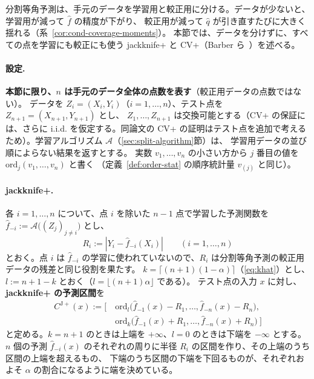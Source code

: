 \documentclass[a4paper,11pt]{jsarticle}
\theoremstyle{definition}
\theoremstyle{plain}
\theoremstyle{remark}
\newcommand{\qhat}{\hat{q}}
\newcommand{\fhat}{\hat{f}}
\begin{document}
分割等角予測は、手元のデータを学習用と較正用に分ける。データが少ないと、学習用が減って $\fhat$ の精度が下がり、
較正用が減って $\qhat$ が引き直すたびに大きく揺れる（系~\ref{cor:cond-coverage-moments}）。
本節では、データを分けずに、すべての点を学習にも較正にも使う jackknife+ と CV+（Barber ら~\cite{barber2021jackknife}）を述べる。

\paragraph{設定.}
\textbf{本節に限り、$n$ は手元のデータ全体の点数を表す}（較正用データの点数ではない）。
データを $Z_i=(X_i,Y_i)$（$i=1,\dots,n$）、テスト点を $Z_{n+1}=(X_{n+1},Y_{n+1})$ とし、
$Z_1,\dots,Z_{n+1}$ は交換可能とする（CV+ の保証には、さらに i.i.d. を仮定する。同論文の CV+ の証明はテスト点を追加で考えるため）。学習アルゴリズム $\mathcal{A}$（\ref{sec:split-algorithm}節）は、
学習用データの並び順によらない結果を返すとする。
実数 $v_1,\dots,v_n$ の小さい方から $j$ 番目の値を $\mathrm{ord}_j(v_1,\dots,v_n)$ と書く
（定義~\ref{def:order-stat} の順序統計量 $v_{(j)}$ と同じ）。

\paragraph{jackknife+.}
各 $i=1,\dots,n$ について、点 $i$ を除いた $n-1$ 点で学習した予測関数を
$\fhat_{-i}:=\mathcal{A}\bigl((Z_j)_{j\ne i}\bigr)$ とし、
\begin{equation}
  \label{eq:loo-residual}
  R_i := |Y_i-\fhat_{-i}(X_i)| \qquad (i=1,\dots,n)
\end{equation}
とおく。点 $i$ は $\fhat_{-i}$ の学習に使われていないので、$R_i$ は分割等角予測の較正用データの残差と同じ役割を果たす。
$k=\lceil(n+1)(1-\alpha)\rceil$（\eqref{eq:khat}）とし、$l:=n+1-k$ とおく（$l=\lfloor(n+1)\alpha\rfloor$ である）。
テスト点の入力 $x$ に対し、\textbf{jackknife+ の予測区間}を
\begin{equation}
  \label{eq:jackknife-plus}
  \begin{aligned}
    C^{\mathrm{J+}}(x):=\bigl[\ &\mathrm{ord}_l\bigl(\fhat_{-1}(x)-R_1,\dots,\fhat_{-n}(x)-R_n\bigr),\\
    &\mathrm{ord}_k\bigl(\fhat_{-1}(x)+R_1,\dots,\fhat_{-n}(x)+R_n\bigr)\ \bigr]
  \end{aligned}
\end{equation}
と定める。$k=n+1$ のときは上端を $+\infty$、$l=0$ のときは下端を $-\infty$ とする。
$n$ 個の予測 $\fhat_{-i}(x)$ のそれぞれの周りに半径 $R_i$ の区間を作り、その上端のうち区間の上端を超えるもの、
下端のうち区間の下端を下回るものが、それぞれおよそ $\alpha$ の割合になるように端を決めている。
\end{document}
